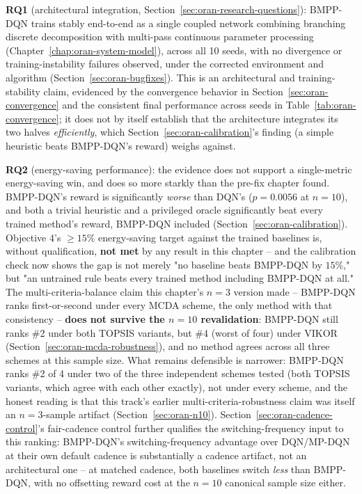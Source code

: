 \textbf{RQ1} (architectural integration, Section~\ref{sec:oran-research-questions}):
BMPP-DQN trains stably end-to-end as a single coupled network combining
branching discrete decomposition with multi-pass continuous parameter
processing (Chapter~\ref{chap:oran-system-model}), across all 10 seeds,
with no divergence or training-instability failures observed, under the
corrected environment and algorithm (Section~\ref{sec:oran-bugfixes}).
This is an architectural and training-stability claim, evidenced by the
convergence behavior in Section~\ref{sec:oran-convergence} and the
consistent final performance across seeds in
Table~\ref{tab:oran-convergence}; it does not by itself establish that
the architecture integrates its two halves \emph{efficiently}, which
Section~\ref{sec:oran-calibration}'s finding (a simple heuristic beats
BMPP-DQN's reward) weighs against.

\textbf{RQ2} (energy-saving performance): the evidence does not support a
single-metric energy-saving win, and does so more starkly than the
pre-fix chapter found. BMPP-DQN's reward is significantly \emph{worse}
than DQN's ($p=0.0056$ at $n=10$), and both a trivial heuristic and a
privileged oracle significantly beat every trained method's reward,
BMPP-DQN included (Section~\ref{sec:oran-calibration}). Objective 4's
$\geq15\%$ energy-saving target against the trained baselines is, without
qualification, \textbf{not met} by any result in this chapter -- and the
calibration check now shows the gap is not merely "no baseline beats
BMPP-DQN by $15\%$," but "an untrained rule beats every trained method
including BMPP-DQN at all." The multi-criteria-balance claim this
chapter's $n=3$ version made -- BMPP-DQN ranks first-or-second under
every MCDA scheme, the only method with that consistency -- \textbf{does
not survive the $n=10$ revalidation}: BMPP-DQN still ranks \#2 under both
TOPSIS variants, but \#4 (worst of four) under VIKOR
(Section~\ref{sec:oran-mcda-robustness}), and no method agrees across all
three schemes at this sample size. What remains defensible is narrower:
BMPP-DQN ranks \#2 of 4 under two of the three independent schemes tested
(both TOPSIS variants, which agree with each other exactly), not under
every scheme, and the honest reading is that this track's earlier
multi-criteria-robustness claim was itself an $n=3$-sample artifact
(Section~\ref{sec:oran-n10}). Section~\ref{sec:oran-cadence-control}'s
fair-cadence control further qualifies the switching-frequency input to
this ranking: BMPP-DQN's switching-frequency advantage over DQN/MP-DQN at
their own default cadence is substantially a cadence artifact, not an
architectural one -- at matched cadence, both baselines switch
\emph{less} than BMPP-DQN, with no offsetting reward cost at the $n=10$
canonical sample size either.


